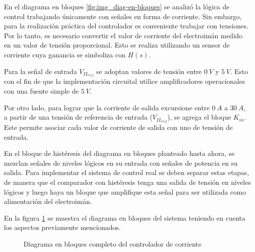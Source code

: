 En el diagrama en bloques \ref{fig:img_diag-en-bloques} se analizó la lógica de control trabajando únicamente con señales en forma de corriente. Sin embargo, para la realización práctica del controlador es conveniente trabajar con tensiones. Por lo tanto, es necesario  convertir el valor de corriente del electroimán medido en un valor de tensión proporcional. Esto se realiza utilizando un sensor de corriente cuya ganancia se simboliza con $H(s)$.

Para la señal de entrada $V_{IL_{ref}}$ se adoptan valores de tensión entre $0\:V$ y $5\:V$. Esto con el fin de que la implementación circuital utilice amplificadores operacionales con una fuente simple de $5\:V$. 

Por otro lado, para lograr que la corriente de salida excursione entre $0\:A$ a $30\:A$, a partir de una tensión de referencia de entrada ($V_{IL_{ref}}$), se agrega el bloque $K_{in}$. Este permite asociar cada valor de corriente de salida con uno de tensión de entrada.

En el bloque de histéresis del diagrama en bloques planteado hasta ahora, se mezclan señales de niveles lógicos en su entrada con señales de potencia en su salida. Para implementar el sistema de control real se deben separar estas etapas, de manera que el comparador con histéresis tenga una salida de tensión en niveles lógicos y luego haya un bloque que amplifique esta señal para ser utilizada como alimentación del electroimán.

En la figura \ref{fig:img_diag-en-bloques-conH-y-Kin} se muestra el diagrama en bloques del sistema teniendo en cuenta los aspectos previamente mencionados.


\begin{figure}[H]
	\centering
	
	\caption{Diagrama en bloques completo del controlador de corriente}	\label{fig:img_diag-en-bloques-conH-y-Kin}
\end{figure}


